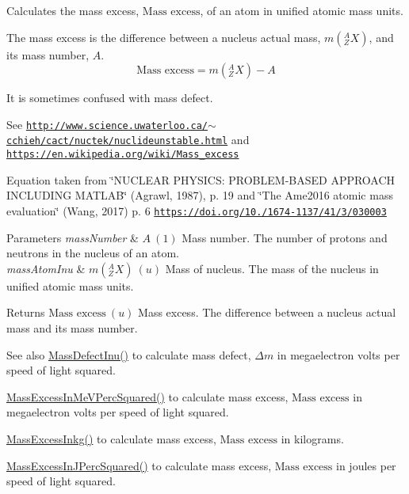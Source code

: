 Calculates the mass excess, $\text{Mass excess}$, of an atom in unified atomic mass units. 

The mass excess is the difference between a nucleus actual mass, $m({^A_ZX})$, and its mass number, $A$. \[\text{Mass excess} = m({^A_ZX}) - A\]

It is sometimes confused with mass defect.

See \href{http://www.science.uwaterloo.ca/~cchieh/cact/nuctek/nuclideunstable.html}{\tt http\+://www.\+science.\+uwaterloo.\+ca/$\sim$cchieh/cact/nuctek/nuclideunstable.\+html} and \href{https://en.wikipedia.org/wiki/Mass_excess}{\tt https\+://en.\+wikipedia.\+org/wiki/\+Mass\+\_\+excess}

Equation taken from \char`\"{}\+N\+U\+C\+L\+E\+A\+R P\+H\+Y\+S\+I\+C\+S\+: P\+R\+O\+B\+L\+E\+M-\/\+B\+A\+S\+E\+D A\+P\+P\+R\+O\+A\+C\+H I\+N\+C\+L\+U\+D\+I\+N\+G M\+A\+T\+L\+A\+B\char`\"{} (Agrawl, 1987), p. 19 and \char`\"{}\+The Ame2016 atomic mass evaluation\char`\"{} (Wang, 2017) p. 6 \href{https://doi.org/10.1088/1674-1137/41/3/030003}{\tt https\+://doi.\+org/10./1674-\/1137/41/3/030003}


\begin{DoxyParams}{Parameters}
{\em mass\+Number} & $A\ (1)$ Mass number. The number of protons and neutrons in the nucleus of an atom. \\
\hline
{\em mass\+Atom\+Inu} & $m({^A_ZX})\ (u)$ Mass of nucleus. The mass of the nucleus in unified atomic mass units. \\
\hline
\end{DoxyParams}
\begin{DoxyReturn}{Returns}
$\text{Mass excess}\ (u)$ Mass excess. The difference between a nucleus actual mass and its mass number. 
\end{DoxyReturn}
\begin{DoxySeeAlso}{See also}
\mbox{\hyperlink{group___e_g_x_phys-_mass_defect_ga70400004a5cb622de372ab84670731ef}{Mass\+Defect\+Inu()}} to calculate mass defect, $\Delta m$ in megaelectron volts per speed of light squared. 

\mbox{\hyperlink{group___e_g_x_phys-_mass_excess_ga99a93b88df3425b7a153c32c05fa5a88}{Mass\+Excess\+In\+Me\+V\+Perc\+Squared()}} to calculate mass excess, $\text{Mass excess}$ in megaelectron volts per speed of light squared. 

\mbox{\hyperlink{group___e_g_x_phys-_mass_excess_gab72a3640886092be8b9c9662020a2306}{Mass\+Excess\+Inkg()}} to calculate mass excess, $\text{Mass excess}$ in kilograms. 

\mbox{\hyperlink{group___e_g_x_phys-_mass_excess_ga3eb487f438543e950b9c5aece4c5b409}{Mass\+Excess\+In\+J\+Perc\+Squared()}} to calculate mass excess, $\text{Mass excess}$ in joules per speed of light squared. 
\end{DoxySeeAlso}

